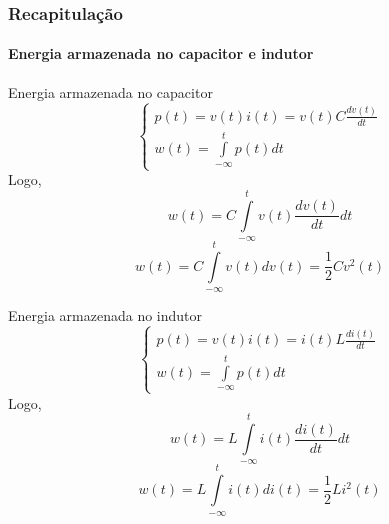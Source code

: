 \documentclass[mathserif,usenames,dvipsnames]{beamer}
\begin{document}
\begin{frame}
\frametitle{Recapitulação}
\framesubtitle{Energia armazenada no capacitor e indutor}
	\begin{minipage}[b]{0.47\linewidth}
		\begin{block}{Energia armazenada no capacitor}
			\begin{equation*}\label{key}
				\left\{ \begin{array}{l}
				p(t) = v(t)i(t) = v(t)C\frac{{dv(t)}}{{dt}}\\
				w(t) = \int\limits_{ - \infty }^t {p(t)dt} 
				\end{array} \right.
			\end{equation*}		
			Logo,
			\begin{equation*}\label{key}
				w(t) = C\int\limits_{ - \infty }^t {v(t)\frac{{dv(t)}}{{dt}}dt} 
			\end{equation*}
			\begin{equation*}\label{key}
				w(t) = C\int\limits_{ - \infty }^t {v(t)dv(t)} = \frac{1}{2}C{v^2}(t)
			\end{equation*}
		\end{block}
	\end{minipage}
	\hfill
	\begin{minipage}[b]{0.47\linewidth}
		\begin{block}{Energia armazenada no indutor}
			\begin{equation*}\label{key}
			\left\{ \begin{array}{l}
			p(t) = v(t)i(t) = i(t)L\frac{{di(t)}}{{dt}}\\
			w(t) = \int\limits_{ - \infty }^t {p(t)dt} 
			\end{array} \right.
			\end{equation*}		
			Logo,
			\begin{equation*}\label{key}
			w(t) = L\int\limits_{ - \infty }^t {i(t)\frac{{di(t)}}{{dt}}dt} 
			\end{equation*}
			\begin{equation*}\label{key}
			w(t) = L\int\limits_{ - \infty }^t {i(t)di(t)} = \frac{1}{2}L{i^2}(t)
			\end{equation*}
		\end{block}
	\end{minipage}
	
\end{frame}
\end{document}

